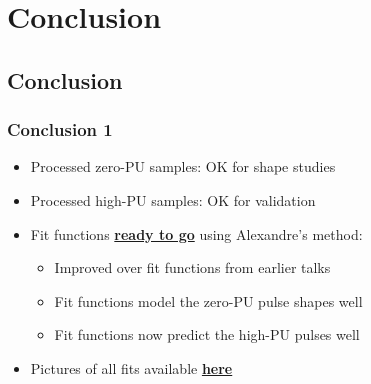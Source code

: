 \documentclass[bigger]{beamer}
\providecommand{\alert}[1]{\textbf{#1}}
\begin{document}
\section{Conclusion}
\label{sec-4}
\subsection{Conclusion}
\label{sec-4-1}
\begin{frame}
\frametitle{Conclusion 1}
\label{sec-4-1-1}
\begin{itemize}

\item Processed zero-PU samples: OK for shape studies
\label{sec-4-1-1-1}%

\item Processed high-PU samples: OK for validation
\label{sec-4-1-1-2}%

\item Fit functions \href{https://github.com/edmundaberry/HcalReco/blob/master/analysis/src/fitResults.C}{\alert{ready to go}} using Alexandre's method:
\label{sec-4-1-1-3}%
\begin{itemize}

\item Improved over fit functions from earlier talks
\label{sec-4-1-1-3-1}%

\item Fit functions model the zero-PU pulse shapes well
\label{sec-4-1-1-3-2}%

\item Fit functions now predict the high-PU pulses well
\label{sec-4-1-1-3-3}%
\end{itemize} %

\item Pictures of all fits available \href{http://eberry.web.cern.ch/eberry/Hcal25nsFits/Hcal25nsFits.pdf}{\alert{here}}
\label{sec-4-1-1-4}%
\end{itemize} %
\end{frame}
\end{document}
